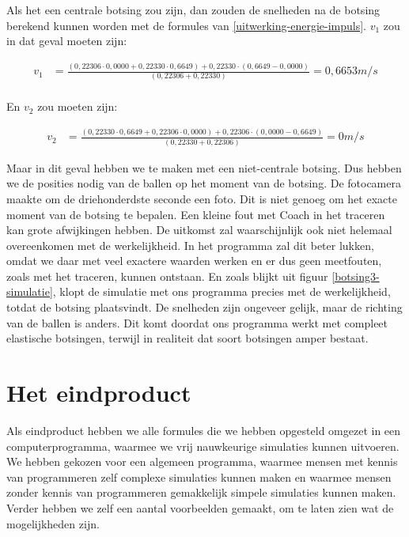 \documentclass[12pt,a4paper]{article}
\begin{document}
	Als het een centrale botsing zou zijn, dan zouden de snelheden na de botsing berekend kunnen worden met de formules van \eqref{uitwerking-energie-impuls}.
	$v_1$ zou in dat geval moeten zijn:

	\begin{equation}
		\begin{aligned}
			v_1&=\frac{\left(0,22306 \cdot 0,0000+0,22330 \cdot 0,6649\right)+0,22330 \cdot \left(0,6649-0,0000\right)}{\left(0,22306+0,22330\right)}=0,6653m/s\\
		\end{aligned}
	\end{equation}

	En $v_2$ zou moeten zijn:

	\begin{equation}
		\begin{aligned}
			v_2&=\frac{\left(0,22330 \cdot 0,6649+0,22306 \cdot 0,0000\right)+0,22306 \cdot \left(0,0000-0,6649\right)}{\left(0,22330+0,22306\right)}=0m/s
		\end{aligned}
	\end{equation}

	Maar in dit geval hebben we te maken met een niet-centrale botsing. Dus hebben we de posities nodig van de ballen op het moment van de botsing. De fotocamera maakte om de driehonderdste seconde een foto. Dit is niet genoeg om het exacte moment van de botsing te bepalen. Een kleine fout met Coach in het traceren kan grote afwijkingen hebben. De uitkomst zal waarschijnlijk ook niet helemaal overeenkomen met de werkelijkheid. In het programma zal dit beter lukken, omdat we daar met veel exactere waarden werken en er dus geen meetfouten, zoals met het traceren, kunnen ontstaan. En zoals blijkt uit figuur \ref{botsing3-simulatie}, klopt de simulatie met ons programma precies met de werkelijkheid, totdat de botsing plaatsvindt. De snelheden zijn ongeveer gelijk, maar de richting van de ballen is anders. Dit komt doordat ons programma werkt met compleet elastische botsingen, terwijl in realiteit dat soort botsingen amper bestaat.

	\newpage

	\section{Het eindproduct}
	Als eindproduct hebben we alle formules die we hebben opgesteld omgezet in een computerprogramma, waarmee we vrij nauwkeurige simulaties kunnen uitvoeren. We hebben gekozen voor een algemeen programma, waarmee mensen met kennis van programmeren zelf complexe simulaties kunnen maken en waarmee mensen zonder kennis van programmeren gemakkelijk simpele simulaties kunnen maken. Verder hebben we zelf een aantal voorbeelden gemaakt, om te laten zien wat de mogelijkheden zijn.
	
\end{document}
